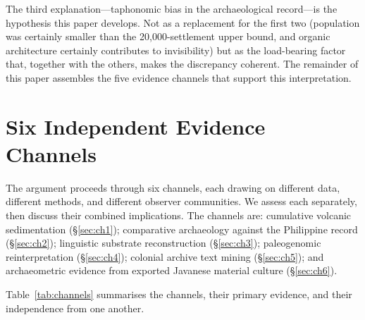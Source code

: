 \documentclass[12pt,a4paper]{article}
\begin{document}
The third explanation---taphonomic bias in the archaeological record---is the hypothesis this paper develops. Not as a replacement for the first two (population was certainly smaller than the 20{,}000-settlement upper bound, and organic architecture certainly contributes to invisibility) but as the load-bearing factor that, together with the others, makes the discrepancy coherent. The remainder of this paper assembles the five evidence channels that support this interpretation.


\section{Six Independent Evidence Channels}
\label{sec:channels}

The argument proceeds through six channels, each drawing on different data, different methods, and different observer communities. We assess each separately, then discuss their combined implications. The channels are: cumulative volcanic sedimentation (\S\ref{sec:ch1}); comparative archaeology against the Philippine record (\S\ref{sec:ch2}); linguistic substrate reconstruction (\S\ref{sec:ch3}); paleogenomic reinterpretation (\S\ref{sec:ch4}); colonial archive text mining (\S\ref{sec:ch5}); and archaeometric evidence from exported Javanese material culture (\S\ref{sec:ch6}).

Table~\ref{tab:channels} summarises the channels, their primary evidence, and their independence from one another.
\end{document}
